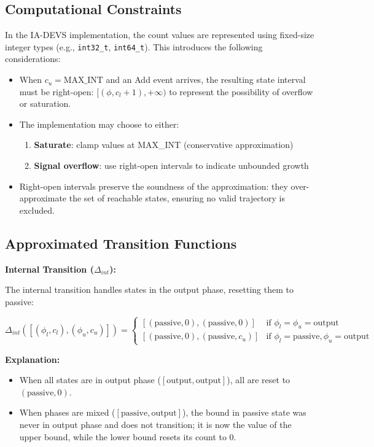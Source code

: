 \subsection{Computational Constraints}

In the IA-DEVS implementation, the count values are represented using fixed-size integer types (e.g., \texttt{int32\_t}, \texttt{int64\_t}). This introduces the following considerations:

\begin{itemize}
    \item When $c_u = \text{MAX\_INT}$ and an Add event arrives, the resulting state interval must be right-open: $[(\phi, c_l + 1), +\infty)$ to represent the possibility of overflow or saturation.
    
    \item The implementation may choose to either:
    \begin{enumerate}
        \item \textbf{Saturate}: clamp values at MAX\_INT (conservative approximation)
        \item \textbf{Signal overflow}: use right-open intervals to indicate unbounded growth
    \end{enumerate}
    
    \item Right-open intervals preserve the soundness of the approximation: they over-approximate the set of reachable states, ensuring no valid trajectory is excluded.
\end{itemize}

\subsection{Approximated Transition Functions}

\textbf{Internal Transition ($\Delta_{int}$):}

The internal transition handles states in the output phase, resetting them to passive:

\[
\Delta_{int}([(\phi_l, c_l), (\phi_u, c_u)]) = 
\begin{cases}
    [(\text{passive}, 0), (\text{passive}, 0)] & \text{if } \phi_l = \phi_u = \text{output} \\
    [(\text{passive}, 0), (\text{passive}, c_u)] & \text{if } \phi_l = \text{passive}, \phi_u = \text{output}
\end{cases}
\]

\textbf{Explanation:}
\begin{itemize}
    \item When all states are in output phase ($[\text{output}, \text{output}]$), all are reset to $(\text{passive}, 0)$.
    \item When phases are mixed ($[\text{passive}, \text{output}]$), the bound in passive state was never in output phase and does not transition; it is now the value of the upper bound, while the lower bound resets its count to 0.
\end{itemize}

